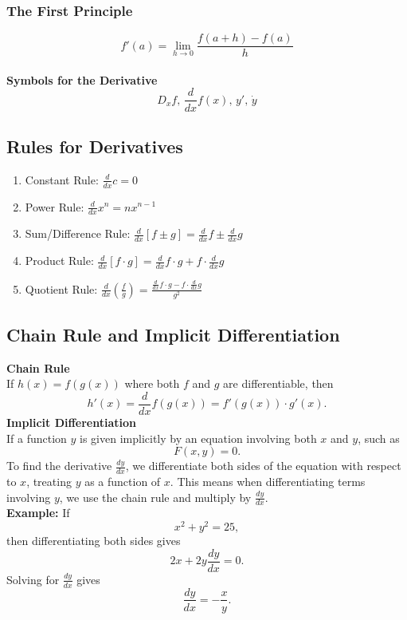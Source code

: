\documentclass[11pt]{article}
\begin{document}
\subsubsection*{The First Principle}
\[
    f'(a)=\lim_{h\to 0}\frac{f(a+h)-f(a)}{h}
\]\\
\textbf{Symbols for the Derivative}
\[
    D_xf\text{, }
    \frac{d}{dx}f(x)\text{, }
    y'\text{, }
    \dot{y}
\]
\subsection{Rules for Derivatives}
\begin{enumerate}
    \item Constant Rule:
    $\displaystyle
        \frac{d}{dx}c = 0
    $
    
    \item Power Rule:
    $\displaystyle
        \frac{d}{dx}x^n = nx^{n-1}
    $
    
    \item Sum/Difference Rule:
    $\displaystyle
        \frac{d}{dx}[f \pm g] = \frac{d}{dx}f \pm \frac{d}{dx}g
    $
    
    \item Product Rule:
    $\displaystyle
        \frac{d}{dx}[f \cdot g] = \frac{d}{dx}f \cdot g + f \cdot \frac{d}{dx}g
    $
    
    \item Quotient Rule:
    $\displaystyle
        \frac{d}{dx}\left(\frac{f}{g}\right) = \frac{\frac{d}{dx}f \cdot g - f \cdot \frac{d}{dx}g}{g^2}
    $
\end{enumerate}
\subsection{Chain Rule and Implicit Differentiation}
\textbf{Chain Rule}\\[.5em]
If $h(x) = f(g(x))$ where both $f$ and $g$ are differentiable, then
\[
    h'(x) = \frac{d}{dx} f(g(x)) = f'(g(x)) \cdot g'(x).
\]
\noindent
\textbf{Implicit Differentiation}\\[.5em]
If a function $y$ is given implicitly by an equation involving both $x$ and $y$, such as
\[
    F(x,y) = 0.
\]
\noindent To find the derivative $\displaystyle\frac{dy}{dx}$, we differentiate both sides of the equation with respect to $x$, treating $y$ as a function of $x$. This means when differentiating terms involving $y$, we use the chain rule and multiply by $\displaystyle\frac{dy}{dx}$.
\noindent\\[.5em]
\textbf{Example:} If
\[
    x^2 + y^2 = 25,
\]
then differentiating both sides gives
\[
    2x + 2y \frac{dy}{dx} = 0.
\]
\noindent
Solving for $\displaystyle\frac{dy}{dx}$ gives
\[
    \frac{dy}{dx} = -\frac{x}{y}.
\]
\end{document}
